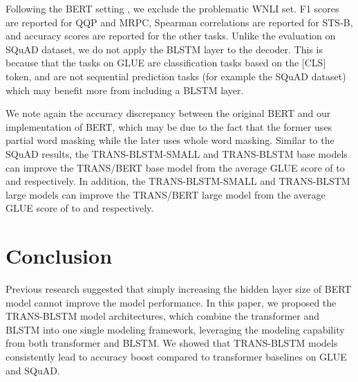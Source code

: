 \documentclass[11pt,a4paper]{article}
\begin{document}
Following the BERT setting \cite{devlin2018}, we exclude the problematic WNLI set. F1 scores are reported for QQP and MRPC, Spearman correlations are reported for STS-B, and accuracy scores are reported for the other tasks. Unlike the evaluation on SQuAD dataset, we do not apply the BLSTM layer to the decoder. This is because that the tasks on GLUE are classification tasks based on the [CLS] token, and are not sequential prediction tasks (for example the SQuAD dataset) which may benefit more from including a BLSTM layer. 

We note again the accuracy discrepancy between the original BERT and our implementation of BERT, which may be due to the fact that the former uses partial word masking while the later uses whole word masking. Similar to the SQuAD results, the TRANS-BLSTM-SMALL and TRANS-BLSTM base models can improve the TRANS/BERT base model from the average GLUE score of  to  and  respectively. In addition, the TRANS-BLSTM-SMALL and TRANS-BLSTM large models can improve the TRANS/BERT large model from the average GLUE score of  to  and  respectively.


\section{Conclusion}
 Previous research suggested that simply increasing the hidden layer size of BERT model cannot improve the model performance. In this paper, we proposed the TRANS-BLSTM model architectures, which combine the transformer and BLSTM into one single modeling framework, leveraging the modeling capability from both transformer and BLSTM. We showed that TRANS-BLSTM models consistently lead to accuracy boost compared to transformer baselines on GLUE and SQuAD. 










\end{document}
